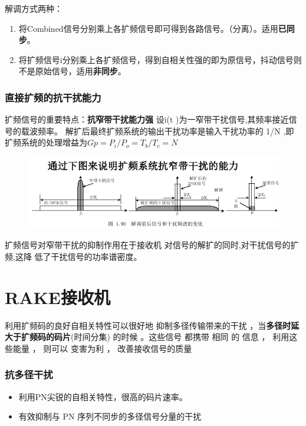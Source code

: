 解调方式两种：
\begin{enumerate}
	\item 将Combined信号分别乘上各扩频信号即可得到各路信号。（分离）。适用\textbf{已同步}。
	\item 将扩频信号i分别乘上各扩频信号，得到自相关性强的即为原信号，抖动信号则不是原始信号，适用\textbf{非同步}。
\end{enumerate}
\subsubsection{直接扩频的抗干扰能力}
扩频信号的重要特点：\textbf{抗窄带干扰能力强}
设i(t )为一窄带干扰信号,其频率接近信号的载波频率。
解扩后最终扩频系统的输出干扰功率是输入干扰功率的
1/N ,即扩频系统的处理增益为$ Gp = P_i/P_o = T_b /T_c = N $

\begin{figure}[htbp]
	\centering
	\includegraphics[width=0.9\linewidth]{figures/kangzaidainengli.png}
	\caption{}
	\label{fig:}
\end{figure}
扩频信号对窄带干扰的抑制作用在于接收机
对信号的解扩的同时,对干扰信号的扩频,这降
低了干扰信号的功率谱密度。\\

\section{RAKE接收机}
 利用扩频码的良好自相关特性可以很好地
抑制多径传输带来的干扰 ，当\textbf{多径时延大于扩频码的码片}(时间分集)
的时候 。这些信号 都携带 相同 的
信息 ， 利用这些能量 ， 则可以
变害为利 ， 改善接收信号的质量 
\subsubsection{抗多径干扰}
\begin{itemize}
	\item 利用PN尖锐的自相关特性，很高的码片速率。
	\item  有效抑制与 PN 序列不同步的多径信号分量的干扰
\end{itemize}
